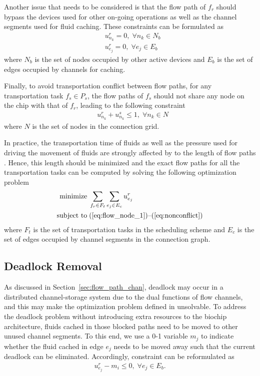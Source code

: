 Another issue that needs to be considered is that the flow path of $f_r$ should bypass the devices used for other on-going operations as well as the channel segments used for fluid caching. These constraints can be formulated as
\begin{align}
&   u^r_{n_k} = 0,\; \forall n_k\in N_b \label{eq:bypass0} \\
&   u^r_{e_j} = 0,\; \forall e_j\in E_b \label{eq:bypass}
\end{align}
where $N_b$ is the set of nodes occupied by other active devices and $E_b$ is the set of edges occupied by  channels for caching.

Finally, to avoid transportation conflict between flow paths, for any transportation task $f_s\in P_s$, the flow paths of $f_s$ should not share any node on the chip with that of $f_r$, leading to the following constraint
\begin{align}
& u^r_{n_k} + u^s_{n_k} \leq 1,\; \forall n_k\in N \label{eq:nonconflict}
\end{align}
where $N$ is the set of nodes in the connection grid.

In practice, the transportation time of fluids as well as the pressure used for driving the movement of fluids are strongly affected by to the length of flow paths \cite{hu2015fault}. Hence, this length should be minimized and the exact flow paths for all the transportation tasks can be computed by solving the following optimization problem
\begin{align}\label{eq:ILP_flow_paths}
\text{minimize} &\; \sum_{f_r\in F_t} \sum_{e_j\in E_c} u^r_{e_j} \\\label{eq:ILP_flow_paths_last}
\text{subject to} & \;
\text{(\ref{eq:flow_node_1})--(\ref{eq:nonconflict})}
\end{align}
where $F_t$ is the set of transportation tasks in the scheduling scheme and $E_c$ is the set of edges occupied by channel segments in the connection graph.

\subsection{Deadlock Removal}\label{sec:res_storage_deadlock}

As discussed in Section~\ref{sec:flow_path_chan}, deadlock may occur in a distributed channel-storage system due to the dual functions of flow channels, and this may make the optimization problem defined in \text{(\ref{eq:ILP_flow_paths})--(\ref{eq:ILP_flow_paths_last})} unsolvable. To address the deadlock problem without introducing extra resources to the biochip architecture, fluids cached in those blocked paths need to be moved to other unused channel segments. To this end, we use a 0-1 variable $m_j$ to indicate whether the fluid cached in edge $e_j$ needs to be moved away such that the current deadlock can be eliminated. Accordingly, constraint \text{(\ref{eq:bypass})} can be reformulated as
\begin{align}\label{eq:bypass_move}
  u^r_{e_j} - m_i \leq 0,\; \forall e_j\in E_b.
\end{align}

